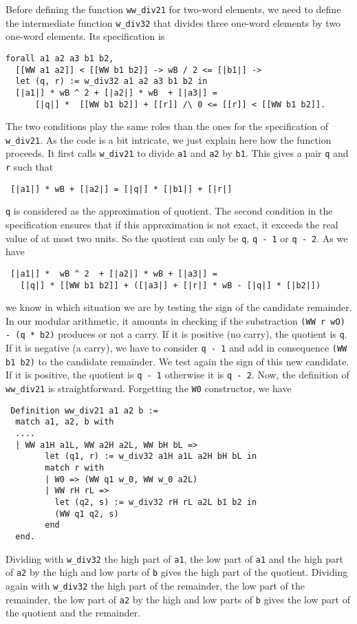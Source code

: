 Before defining the function {\tt ww\_div21} for two-word elements,
we need to define the intermediate function  {\tt w\_div32}
that divides three one-word elements by two one-word elements.
Its specification is
\begin{verbatim}
forall a1 a2 a3 b1 b2, 
  [[WW a1 a2]] < [[WW b1 b2]] -> wB / 2 <= [|b1|] ->
  let (q, r) := w_div32 a1 a2 a3 b1 b2 in
  [|a1|] * wB ^ 2 + [|a2|] * wB  + [|a3|] =  
      [|q|] *  [[WW b1 b2]] + [[r]] /\ 0 <= [[r]] < [[WW b1 b2]].
\end{verbatim}
The two conditions play the same roles than the ones for the specification of {\tt w\_div21}.
As the code is a bit intricate, we just explain here how the function
proceeds. It first calls {\tt w\_div21} to divide {\tt a1} and {\tt a2}
by {\tt b1}. This gives a pair {\tt q} and {\tt r} such that
\begin{verbatim}
 [|a1|] * wB + [|a2|] = [|q|] * [|b1|] + [|r|]
\end{verbatim}
{\tt q} is considered as the approximation of quotient.
The second condition in the specification ensures that if this approximation
is not exact, it exceeds the real value of at most two units. So the quotient 
can only be {\tt q}, {\tt q - 1} or {\tt q - 2}. 
As we have 
\begin{verbatim}
 [|a1|] *  wB ^ 2  + [|a2|] * wB + [|a3|] = 
   [|q|] * [[WW b1 b2]] + ([|a3|] + [|r|] * wB - [|q|] * [|b2|])
\end{verbatim}
we know in which situation we are by testing the sign of the candidate
remainder.
In our modular arithmetic, it amounts in checking if the substraction   {\tt (WW r wO) - (q * b2)} 
produces or not a carry.  
If it is positive (no carry), the quotient is {\tt q}. If it is negative (a carry), we
have to consider {\tt q - 1} and add in consequence {\tt (WW b1 b2)} to the candidate remainder.
We test again the sign of this new candidate. If it is positive, the quotient is {\tt q - 1}
otherwise it is {\tt q - 2}.
Now, the definition of {\tt ww\_div21} is straightforward. Forgetting the {\tt W0}
constructor, we have
\begin{verbatim} 
 Definition ww_div21 a1 a2 b :=
  match a1, a2, b with
  ....  
  | WW a1H a1L, WW a2H a2L, WW bH bL =>
        let (q1, r) := w_div32 a1H a1L a2H bH bL in
        match r with
        | W0 => (WW q1 w_0, WW w_0 a2L)
        | WW rH rL =>
          let (q2, s) := w_div32 rH rL a2L b1 b2 in
          (WW q1 q2, s)
        end
  end.
\end{verbatim}
Dividing with {\tt w\_div32} the high part of {\tt a1}, the low part of {\tt a1} and the high part of {\tt a2}
by the high and low parts of {\tt b} gives the high part of the quotient. Dividing again with {\tt w\_div32} 
the high part of the remainder, the low part of the remainder, the low part of {\tt a2} by the high and 
low parts of {\tt b} gives  the low part of the quotient and the remainder.
  

